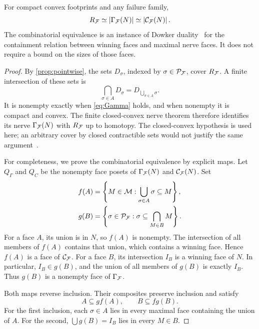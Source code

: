 \begin{theorem}\label{thm:duality}
For compact convex footprints and any failure family,
\begin{equation}\label{eq:homotopy-chain}
R_{\mathcal F}\simeq\left|\Gamma_{\mathcal F}(N)\right|\simeq\left|\mathcal C_{\mathcal F}(N)\right|.
\end{equation}
The combinatorial equivalence is an instance of Dowker duality~\cite{dowker,chowdhury} for the containment relation between winning faces and maximal nerve faces. It does not require a bound on the sizes of those faces.
\end{theorem}
\begin{proof}
By \cref{prop:pointwise}, the sets $D_\sigma$, indexed by $\sigma\in\mathcal P_{\mathcal F}$, cover $R_{\mathcal F}$. A finite intersection of these sets is
\[
\bigcap_{\sigma\in A}D_\sigma=D_{\bigcup_{\sigma\in A}\sigma}.
\]
It is nonempty exactly when \cref{eq:Gamma} holds, and when nonempty it is compact and convex. The finite closed-convex nerve theorem therefore identifies its nerve $\Gamma_{\mathcal F}(N)$ with $R_{\mathcal F}$ up to homotopy. The closed-convex hypothesis is used here; an arbitrary cover by closed contractible sets would not justify the same argument~\cite{bauer}.

For completeness, we prove the combinatorial equivalence by explicit maps. Let $Q_\Gamma$ and $Q_C$ be the nonempty face posets of $\Gamma_{\mathcal F}(N)$ and $\mathcal C_{\mathcal F}(N)$. Set
\begin{align}
f(A)&=\left\{M\in\mathcal M:\bigcup_{\sigma\in A}\sigma\subseteq M\right\},\label{eq:f-map}\\
g(B)&=\left\{\sigma\in\mathcal P_{\mathcal F}:\sigma\subseteq\bigcap_{M\in B}M\right\}.\label{eq:g-map}
\end{align}
For a face $A$, its union is in $N$, so $f(A)$ is nonempty. The intersection of all members of $f(A)$ contains that union, which contains a winning face. Hence $f(A)$ is a face of $\mathcal C_{\mathcal F}$. For a face $B$, its intersection $I_B$ is a winning face of $N$. In particular, $I_B\in g(B)$, and the union of all members of $g(B)$ is exactly $I_B$. Thus $g(B)$ is a nonempty face of $\Gamma_{\mathcal F}$.

Both maps reverse inclusion. Their composites preserve inclusion and satisfy
\begin{equation}\label{eq:closure-inequalities}
A\subseteq g f(A),\qquad B\subseteq f g(B).
\end{equation}
For the first inclusion, each $\sigma\in A$ lies in every maximal face containing the union of $A$. For the second, $\bigcup g(B)=I_B$ lies in every $M\in B$.


\end{proof}
